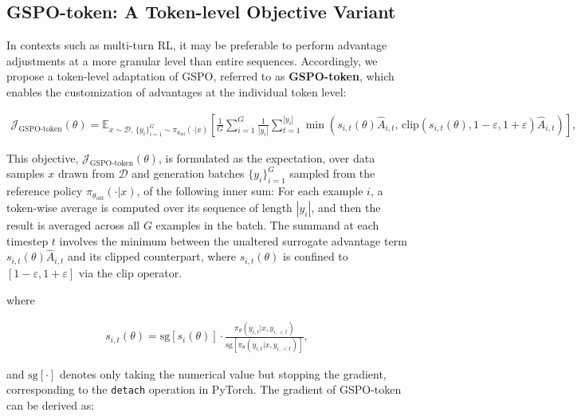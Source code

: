 \subsection{GSPO-token: A Token-level Objective Variant}

In contexts such as multi-turn RL, it may be preferable to perform advantage adjustments at a more granular level than entire sequences. Accordingly, we propose a token-level adaptation of GSPO, referred to as \textbf{GSPO-token}, which enables the customization of advantages at the individual token level:

\begin{align}
\mathcal{J}_\text{GSPO-token}(\theta)
=
\mathbb{E}_{ x \sim \mathcal{D},\, \{y_i\}_{i=1}^G \sim \pi_{\theta_\text{old}}( \cdot | x) }
\left[ 
\frac{1}{G} \sum_{i=1}^{G} \frac{1}{|y_i|} \sum_{t=1}^{|y_i|} 
\min \left( s_{i,t}(\theta) \widehat{A}_{i,t},  \, \mathrm{clip} \left( s_{i,t}(\theta), 1 - {\varepsilon}, 1 + {\varepsilon} \right) \widehat{A}_{i,t} \right) 
\right],
\label{equ:gspo-token}
\end{align}

This objective, $\mathcal{J}_\text{GSPO-token}(\theta)$, is formulated as the expectation, over data samples $x$ drawn from $\mathcal{D}$ and generation batches $\{y_i\}_{i=1}^G$ sampled from the reference policy $\pi_{\theta_\text{old}}(\cdot|x)$, of the following inner sum: For each example $i$, a token-wise average is computed over its sequence of length $|y_i|$, and then the result is averaged across all $G$ examples in the batch. The summand at each timestep $t$ involves the minimum between the unaltered surrogate advantage term $s_{i,t}(\theta) \widehat{A}_{i,t}$ and its clipped counterpart, where $s_{i,t}(\theta)$ is confined to $[1-{\varepsilon}, 1+{\varepsilon}]$ via the $\mathrm{clip}$ operator.

where

\begin{align}
s_{i,t}(\theta) 
= \mathrm{sg} \left[ s_{i}(\theta) \right]  \cdot \frac{ \pi_{\theta} (y_{i,t} | x, y_{i,<t}) }{ \mathrm{sg} \left[ \pi_{\theta} (y_{i,t} | x, y_{i,<t}) \right] },
\end{align}

and $\mathrm{sg}[\cdot]$ denotes only taking the numerical value but stopping the gradient, corresponding to the \texttt{detach} operation in PyTorch. The gradient of GSPO-token can be derived as:

